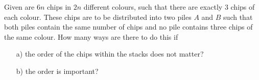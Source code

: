 Given are $6n$ chips in $2n$ different colours, such that there are exactly $3$ chips of each colour. 
These chips are to be distributed into two piles $A$ and $B$ such that both piles
contain the same number of chips and no pile contains three chips of the same colour.
How many ways are there to do this if
\begin{enumerate}
    \item[a)] the order of the chips within the stacks does not matter?
    \item[b)] the order is important?
\end{enumerate}
